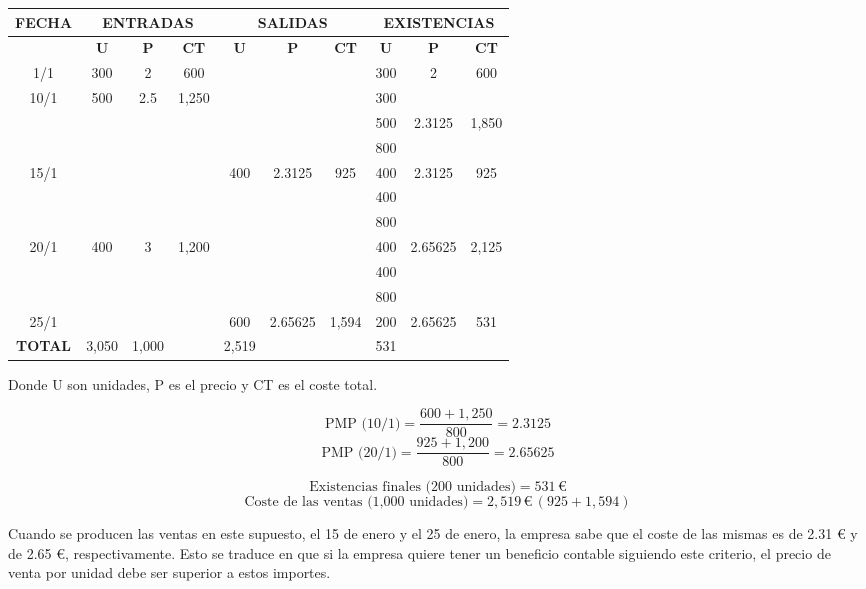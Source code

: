 \documentclass{article}
\begin{document}
\begin{table}[H]
    \centering
    \begin{tabular}{|c|ccc|ccc|ccc|}
    \hline
    \textbf{FECHA} & \multicolumn{3}{c|}{\textbf{ENTRADAS}} & \multicolumn{3}{c|}{\textbf{SALIDAS}} & \multicolumn{3}{c|}{\textbf{EXISTENCIAS}} \\
    \hline
     & \textbf{U} & \textbf{P} & \textbf{CT} & \textbf{U} & \textbf{P} & \textbf{CT} & \textbf{U} & \textbf{P} & \textbf{CT} \\
    \hline
    1/1 & 300 & 2 & 600 &  &  &  & 300 & 2 & 600 \\
    \hline
    10/1 & 500 & 2.5 & 1,250 &  &  &  & 300 &  &  \\
     &  &  &  &  &  &  & 500 & 2.3125 & 1,850 \\
     &  &  &  &  &  &  & 800 &  &  \\
    \hline
    15/1 &  &  &  & 400 & 2.3125 & 925 & 400 & 2.3125 & 925 \\
     &  &  &  &  &  &  & 400 &  &  \\
     &  &  &  &  &  &  & 800 &  &  \\
    \hline
    20/1 & 400 & 3 & 1,200 &  &  &  & 400 & 2.65625 & 2,125 \\
     &  &  &  &  &  &  & 400 &  &  \\
     &  &  &  &  &  &  & 800 &  &  \\
    \hline
    25/1 &  &  &  & 600 & 2.65625 & 1,594 & 200 & 2.65625 & 531 \\
    \hline
    \textbf{TOTAL} & 3,050 & 1,000 &  & 2,519 &  &  & 531 &  &  \\
    \hline
    \end{tabular}
\end{table}
    
    
    
Donde U son unidades, P es el precio y CT es el coste total.

\[
\text{PMP (10/1)} = \frac{600 + 1,250}{800} = 2.3125\]
\[\text{PMP (20/1)} = \frac{925 + 1,200}{800} = 2.65625
\]

\[
\text{Existencias finales (200 unidades)} = 531 \, \text{€}
\]
\[
\text{Coste de las ventas (1,000 unidades)} = 2,519 \, \text{€} \, (925 + 1,594)
\]

Cuando se producen las ventas en este supuesto, el 15 de enero y el 25 de enero, la empresa sabe que el coste de las mismas es de 2.31 € y de 2.65 €, respectivamente. Esto se traduce en que si la empresa quiere tener un beneficio contable siguiendo este criterio, el precio de venta por unidad debe ser superior a estos importes.
\end{document}
